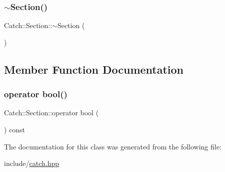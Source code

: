 \mbox{\label{classCatch_1_1Section_aa1422edd68a77aa578b5cc6b8b69f86f}} 
\subsubsection{\texorpdfstring{$\sim$\+Section()}{~Section()}}
{\footnotesize\ttfamily Catch\+::\+Section\+::$\sim$\+Section (\begin{DoxyParamCaption}{ }\end{DoxyParamCaption})}



\subsection{Member Function Documentation}
\mbox{\label{classCatch_1_1Section_a0632b804dcea1417a2970620a9742eb3}} 
\subsubsection{\texorpdfstring{operator bool()}{operator bool()}}
{\footnotesize\ttfamily Catch\+::\+Section\+::operator bool (\begin{DoxyParamCaption}{ }\end{DoxyParamCaption}) const\hspace{0.3cm}{\ttfamily [explicit]}}



The documentation for this class was generated from the following file\+:\begin{DoxyCompactItemize}
\item 
include/\mbox{\hyperlink{catch_8hpp}{catch.\+hpp}}\end{DoxyCompactItemize}
